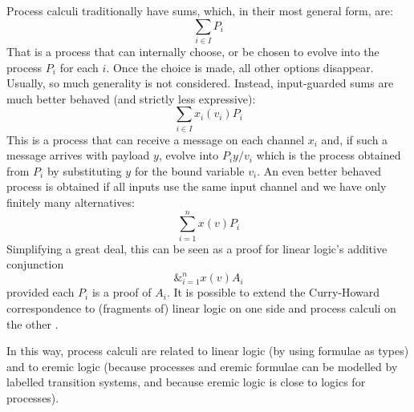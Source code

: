 Process calculi traditionally have sums, which, in their most general
form, are:
\[
     \sum_{i \in I} P_i
\]
That is a process that can internally choose, or be chosen to evolve
into the process $P_i$ for each $i$. Once the choice is made, all
other options disappear.  Usually, so much generality is not
considered. Instead, input-guarded sums are much better behaved (and
strictly less expressive):
  \[
     \sum_{i \in I} x_{i}(v_i)P_i
  \]
This is a process that can receive a message on each channel $x_i$
and, if such a message arrives with payload $y$, evolve into
$P_i{y/v_i}$ which is the process obtained from $P_i$ by substituting
$y$ for the bound variable $v_i$.  An even better behaved process is
obtained if all inputs use the same input channel and we have only
finitely many alternatives:
  \[
     \sum_{i = 1}^n x(v)P_i
  \]
  Simplifying a great deal, this can be seen as a proof for linear
  logic's additive conjunction
  \[
     \&_{i = 1}^n x(v)A_i
  \]
  provided each $P_i$ is a proof of $A_i$.  It is possible to extend
  the Curry-Howard correspondence to (fragments of) linear logic on
  one side and process calculi on the other \cite{GaySJ:typcalosp}.

In this way, process calculi are related to linear logic (by using
formulae as types) and to eremic logic (because processes and eremic
formulae can be modelled by labelled transition systems, and because
eremic logic is close to logics for processes).



